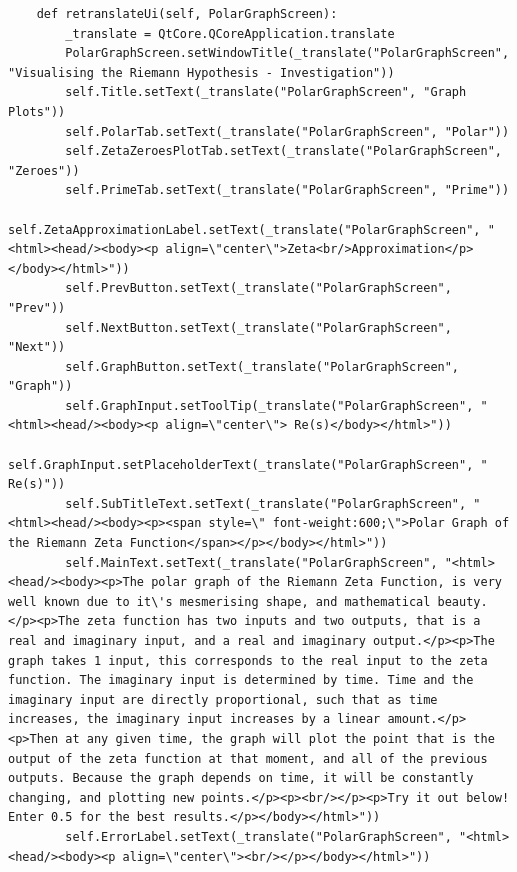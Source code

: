 \documentclass{article}
\begin{document}
\begin{lstlisting}
    def retranslateUi(self, PolarGraphScreen):
        _translate = QtCore.QCoreApplication.translate
        PolarGraphScreen.setWindowTitle(_translate("PolarGraphScreen", "Visualising the Riemann Hypothesis - Investigation"))
        self.Title.setText(_translate("PolarGraphScreen", "Graph Plots"))
        self.PolarTab.setText(_translate("PolarGraphScreen", "Polar"))
        self.ZetaZeroesPlotTab.setText(_translate("PolarGraphScreen", "Zeroes"))
        self.PrimeTab.setText(_translate("PolarGraphScreen", "Prime"))
        self.ZetaApproximationLabel.setText(_translate("PolarGraphScreen", "<html><head/><body><p align=\"center\">Zeta<br/>Approximation</p></body></html>"))
        self.PrevButton.setText(_translate("PolarGraphScreen", "Prev"))
        self.NextButton.setText(_translate("PolarGraphScreen", "Next"))
        self.GraphButton.setText(_translate("PolarGraphScreen", "Graph"))
        self.GraphInput.setToolTip(_translate("PolarGraphScreen", "<html><head/><body><p align=\"center\"> Re(s)</body></html>"))
        self.GraphInput.setPlaceholderText(_translate("PolarGraphScreen", "          Re(s)"))
        self.SubTitleText.setText(_translate("PolarGraphScreen", "<html><head/><body><p><span style=\" font-weight:600;\">Polar Graph of the Riemann Zeta Function</span></p></body></html>"))
        self.MainText.setText(_translate("PolarGraphScreen", "<html><head/><body><p>The polar graph of the Riemann Zeta Function, is very well known due to it\'s mesmerising shape, and mathematical beauty.</p><p>The zeta function has two inputs and two outputs, that is a real and imaginary input, and a real and imaginary output.</p><p>The graph takes 1 input, this corresponds to the real input to the zeta function. The imaginary input is determined by time. Time and the imaginary input are directly proportional, such that as time increases, the imaginary input increases by a linear amount.</p><p>Then at any given time, the graph will plot the point that is the output of the zeta function at that moment, and all of the previous outputs. Because the graph depends on time, it will be constantly changing, and plotting new points.</p><p><br/></p><p>Try it out below! Enter 0.5 for the best results.</p></body></html>"))
        self.ErrorLabel.setText(_translate("PolarGraphScreen", "<html><head/><body><p align=\"center\"><br/></p></body></html>"))
\end{lstlisting}
\end{document}
